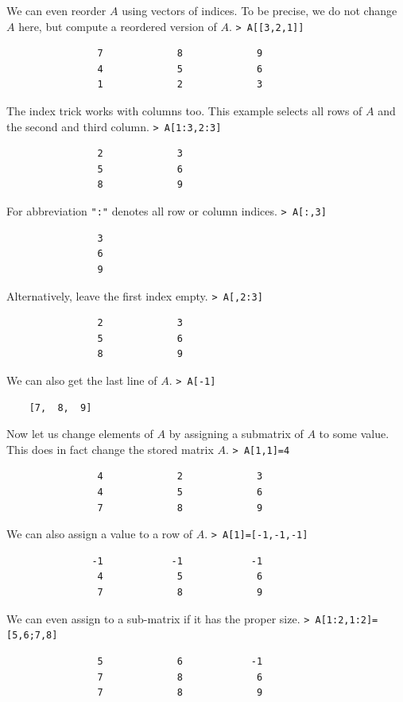 \documentclass[11pt, a4paper]{article}
\newcommand{\emtcmd}[1]{\noindent\texttt{\textcolor{emtcommand}{>}\ #1}\par\smallskip}
\begin{document}
We can even reorder $A$ using vectors of indices. To be precise, we do not change $A$ here, but compute a reordered version of $A$.
\emtcmd{A[[3,2,1]]}
\begin{verbatim}
                7             8             9
                4             5             6
                1             2             3
\end{verbatim}

The index trick works with columns too. This example selects all rows of $A$ and the second and third column.
\emtcmd{A[1:3,2:3]}
\begin{verbatim}
                2             3
                5             6
                8             9
\end{verbatim}

For abbreviation \texttt{":"} denotes all row or column indices.
\emtcmd{A[:,3]}
\begin{verbatim}
                3
                6
                9
\end{verbatim}

Alternatively, leave the first index empty.
\emtcmd{A[,2:3]}
\begin{verbatim}
                2             3
                5             6
                8             9
\end{verbatim}

We can also get the last line of $A$.
\emtcmd{A[-1]}
\begin{verbatim}
    [7,  8,  9]
\end{verbatim}

Now let us change elements of $A$ by assigning a submatrix of $A$ to some value. This does in fact change the stored matrix $A$.
\emtcmd{A[1,1]=4}
\begin{verbatim}
                4             2             3
                4             5             6
                7             8             9
\end{verbatim}

We can also assign a value to a row of $A$.
\emtcmd{A[1]=[-1,-1,-1]}
\begin{verbatim}
               -1            -1            -1
                4             5             6
                7             8             9
\end{verbatim}

We can even assign to a sub-matrix if it has the proper size.
\emtcmd{A[1:2,1:2]=[5,6;7,8]}
\begin{verbatim}
                5             6            -1
                7             8             6
                7             8             9
\end{verbatim}
\end{document}
